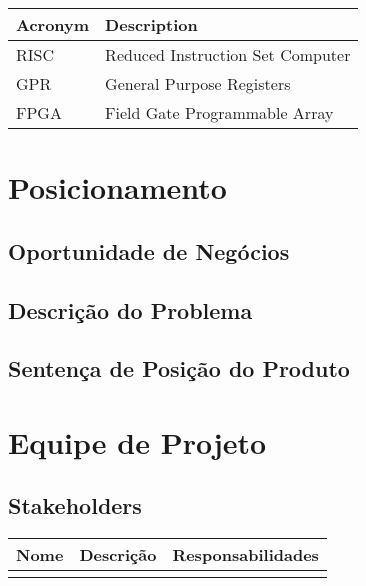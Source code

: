 \documentclass{article}
\begin{document}
  \FloatBarrier
  \begin{table}[H]
    \begin{center} \label{tab:definitions}
      \begin{tabular}[pos]{|m{2cm} | m{9cm}|} 
        \hline
        \cellcolor[gray]{0.9}\textbf{Acronym} & \cellcolor[gray]{0.9}\textbf{Description} \\ \hline
        RISC & Reduced Instruction Set Computer \\ \hline
        GPR & General Purpose Registers \\ \hline
        FPGA & Field Gate Programmable Array \\ \hline
      \end{tabular}
    \end{center}
  \end{table}
  

\section{Posicionamento}
\subsection{Oportunidade de Negócios}

\subsection{Descrição do Problema}

\subsection{Sentença de Posição do Produto}

\section{Equipe de Projeto}
\subsection{Stakeholders}
  \FloatBarrier
  \begin{table}[H]
    \begin{center} \label{tab:definitions}
      \begin{tabular}[pos]{|m{4cm} | m{5cm}| m{6cm} |} 
        \hline
        \cellcolor[gray]{0.9}\textbf{Nome} & \cellcolor[gray]{0.9}\textbf{Descrição} & \cellcolor[gray]{0.9}\textbf{Responsabilidades}\\ \hline
         & & \\ \hline
       
      \end{tabular}
    \end{center}
  \end{table}
\end{document}

